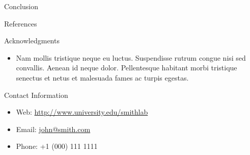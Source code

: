\documentclass[final,hyperref={pdfpagelabels=false}]{beamer}
\begin{document}
\begin{frame}[t]
\begin{columns}[t]
\begin{column}{.465\textwidth}
\begin{block}{Conclusion}
            \end{block}


            \begin{block}{References}

                \nocite{*} %
                \small{
                    }

            \end{block}


            \begin{block}{Acknowledgments}

                \begin{itemize}
                    \item Nam mollis tristique neque eu luctus. Suspendisse rutrum congue nisi sed convallis. Aenean id neque dolor. Pellentesque habitant morbi tristique senectus et netus et malesuada fames ac turpis egestas.
                \end{itemize}

            \end{block}



            \begin{block}{Contact Information}

                \begin{itemize}
                    \item Web: \href{http://www.university.edu/smithlab}{http://www.university.edu/smithlab}
                    \item Email: \href{mailto:john@smith.com}{john@smith.com}
                    \item Phone: +1 (000) 111 1111
                \end{itemize}


\end{block}
\end{column}
\end{columns}
\end{frame}
\end{document}
